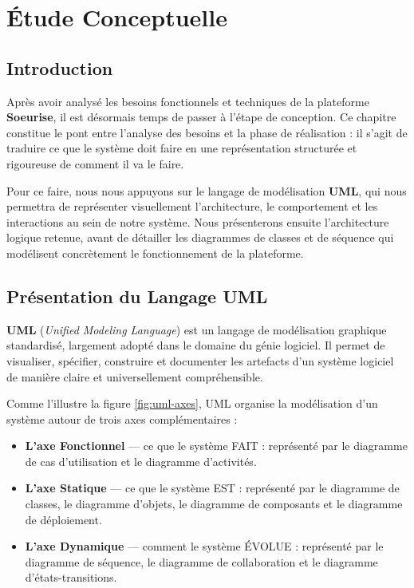 \documentclass[12pt,a4paper]{report}
\begin{document}
	\chapter{Étude Conceptuelle}
	
	\section{Introduction}
	
	Après avoir analysé les besoins fonctionnels et techniques de la plateforme 
	\textbf{Soeurise}, il est désormais temps de passer à l'étape de conception. 
	Ce chapitre constitue le pont entre l'analyse des besoins et la phase de 
	réalisation : il s'agit de traduire ce que le système doit faire en une 
	représentation structurée et rigoureuse de comment il va le faire.
	
	Pour ce faire, nous nous appuyons sur le langage de modélisation \textbf{UML}, 
	qui nous permettra de représenter visuellement l'architecture, le comportement 
	et les interactions au sein de notre système. Nous présenterons ensuite 
	l'architecture logique retenue, avant de détailler les diagrammes de classes 
	et de séquence qui modélisent concrètement le fonctionnement de la plateforme.
	
	\section{Présentation du Langage UML}
	
	\textbf{UML} (\textit{Unified Modeling Language}) est un langage de modélisation 
	graphique standardisé, largement adopté dans le domaine du génie logiciel. 
	Il permet de visualiser, spécifier, construire et documenter les artefacts 
	d'un système logiciel de manière claire et universellement compréhensible.
	
	Comme l'illustre la figure \ref{fig:uml-axes}, UML organise la modélisation 
	d'un système autour de trois axes complémentaires :
	
	\begin{itemize}
		\item \textbf{L'axe Fonctionnel} — ce que le système FAIT : représenté 
		par le diagramme de cas d'utilisation et le diagramme d'activités.
		
		\item \textbf{L'axe Statique} — ce que le système EST : représenté 
		par le diagramme de classes, le diagramme d'objets, le diagramme 
		de composants et le diagramme de déploiement.
		
		\item \textbf{L'axe Dynamique} — comment le système ÉVOLUE : représenté 
		par le diagramme de séquence, le diagramme de collaboration et le 
		diagramme d'états-transitions.
	\end{itemize}
	
\end{document}
